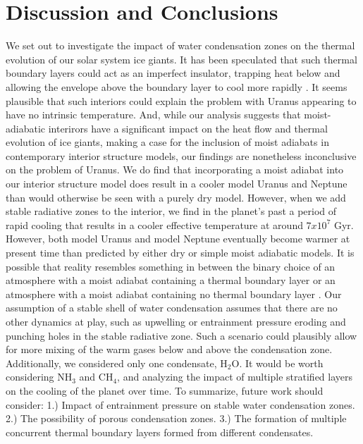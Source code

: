 \documentclass[11pt]{ucscthesisbs}
\begin{document}
\chapter{Discussion and Conclusions}
We set out to investigate the impact of water condensation zones on the thermal evolution of our solar system ice giants. It has been speculated that such thermal boundary layers could act as an imperfect insulator, trapping heat below and allowing the envelope above the boundary layer to cool more rapidly \citep{nettelmann_2016}\citep{friedson_2017}\citep{leconte_2017}\citep{podolak_1991}\citep{scheibe_2019}. It seems plausible that such interiors could explain the problem with Uranus appearing to have no intrinsic temperature. And, while our analysis suggests that moist-adiabatic interirors have a significant impact on the heat flow and thermal evolution of ice giants, making a case for the inclusion of moist adiabats in contemporary interior structure models, our findings are nonetheless inconclusive on the problem of Uranus. We do find that incorporating a moist adiabat into our interior structure model does result in a cooler model Uranus and Neptune than would otherwise be seen with a purely dry model. However, when we add stable radiative zones to the interior, we find in the planet's past a period of rapid cooling that results in a cooler effective temperature at around $7 x 10^7$ Gyr. However, both model Uranus and model Neptune eventually become warmer at present time than predicted by either dry or simple moist adiabatic models. It is possible that reality resembles something in between the binary choice of an atmosphere with a moist adiabat containing a thermal boundary layer or an atmosphere with a moist adiabat containing no thermal boundary layer \citep{guillot_2019}. Our assumption of a stable shell of water condensation assumes that there are no other dynamics at play, such as upwelling or entrainment pressure \citep{friedson_2017} eroding and punching holes in the stable radiative zone. Such a scenario could plausibly allow for more mixing of the warm gases below and above the condensation zone. Additionally, we considered only one condensate, H$_{2}$O. It would be worth considering NH$_{3}$ and CH$_{4}$, and analyzing the impact of multiple stratified layers on the cooling of the planet over time. To summarize, future work should consider: 1.) Impact of entrainment pressure on stable water condensation zones. 2.) The possibility of porous condensation zones. 3.) The formation of multiple concurrent thermal boundary layers formed from different condensates. 



\newcommand{\newblock}{}

\end{document}
